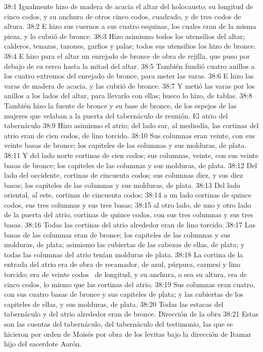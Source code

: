 38:1 Igualmente hizo de madera de acacia el altar del holocausto; su longitud de cinco codos, y su anchura de otros cinco codos, cuadrado, y de tres codos de altura. 
38:2 E hizo sus cuernos a sus cuatro esquinas, los cuales eran de la misma pieza, y lo cubrió de bronce. 
38:3 Hizo asimismo todos los utensilios del altar; calderos, tenazas, tazones, garfios y palas; todos sus utensilios los hizo de bronce. 
38:4 E hizo para el altar un enrejado de bronce de obra de rejilla, que puso por debajo de su cerco hasta la mitad del altar. 
38:5 También fundió cuatro anillos a los cuatro extremos del enrejado de bronce, para meter las varas. 
38:6 E hizo las varas de madera de acacia, y las cubrió de bronce. 
38:7 Y metió las varas por los anillos a los lados del altar, para llevarlo con ellas; hueco lo hizo, de tablas. 
38:8 También hizo la fuente de bronce y su base de bronce, de los espejos de las mujeres que velaban a la puerta del tabernáculo de reunión. 
El atrio del tabernáculo  
38:9 Hizo asimismo el atrio; del lado sur, al mediodía, las cortinas del atrio eran de cien codos, de lino torcido. 
38:10 Sus columnas eran veinte, con sus veinte basas de bronce; los capiteles de las columnas y sus molduras, de plata. 
38:11 Y del lado norte cortinas de cien codos; sus columnas, veinte, con sus veinte basas de bronce; los capiteles de las columnas y sus molduras, de plata. 
38:12 Del lado del occidente, cortinas de cincuenta codos; sus columnas diez, y sus diez basas; los capiteles de las columnas y sus molduras, de plata. 
38:13 Del lado oriental, al este, cortinas de cincuenta codos; 
38:14 a un lado cortinas de quince codos, sus tres columnas y sus tres basas; 
38:15 al otro lado, de uno y otro lado de la puerta del atrio, cortinas de quince codos, con sus tres columnas y sus tres basas. 
38:16 Todas las cortinas del atrio alrededor eran de lino torcido. 
38:17 Las basas de las columnas eran de bronce; los capiteles de las columnas y sus molduras, de plata; asimismo las cubiertas de las cabezas de ellas, de plata; y todas las columnas del atrio tenían molduras de plata. 
38:18 La cortina de la entrada del atrio era de obra de recamador, de azul, púrpura, carmesí y lino torcido; era de veinte codos  de longitud, y su anchura, o sea su altura, era de cinco codos, lo mismo que las cortinas del atrio. 
38:19 Sus columnas eran cuatro, con sus cuatro basas de bronce y sus capiteles de plata; y las cubiertas de los capiteles de ellas, y sus molduras, de plata. 
38:20 Todas las estacas del tabernáculo y del atrio alrededor eran de bronce. 
Dirección de la obra 
38:21 Estas son las cuentas del tabernáculo, del tabernáculo del testimonio, las que se hicieron por orden de Moisés por obra de los levitas bajo la dirección de Itamar hijo del sacerdote Aarón. 
